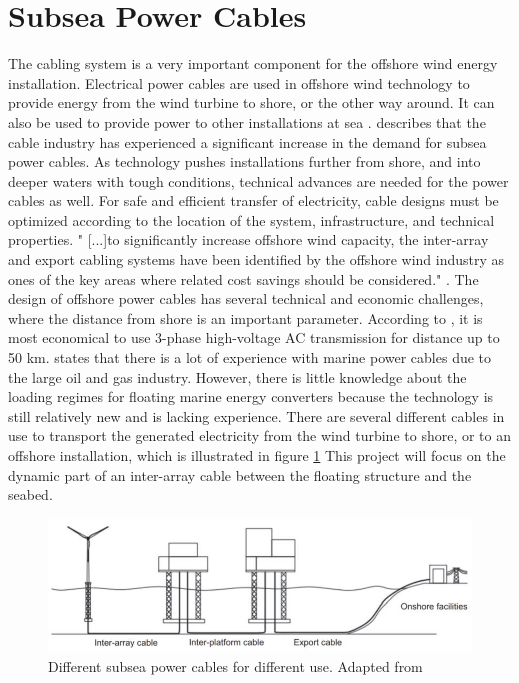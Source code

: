 \section{Subsea Power Cables}
 The cabling system is a very important component for the offshore wind energy installation. Electrical power cables are used in offshore wind technology to provide energy from the wind turbine to shore, or the other way around. It can also be used to provide power to other installations at sea \cite{Nasution2013}.  \cite{srinil2016} describes that the cable industry has experienced a significant increase in the demand for subsea power cables. As technology pushes installations further from shore, and into deeper waters with tough conditions, technical advances are needed for the power cables as well. For safe and efficient transfer of electricity, cable designs must be optimized according to the location of the system, infrastructure, and technical properties. " [...]to significantly increase offshore wind capacity, the inter-array and export cabling systems have been identified by the offshore wind industry as ones of the key areas where related cost savings should be considered."  \cite{srinil2016}. The design of offshore power cables has several technical and economic challenges, where the distance from shore is an important parameter. According to \cite{Lynn2011}, it is most economical to use 3-phase high-voltage AC transmission for distance up to 50 km.\newline
 \newline
 \cite{Thies2012} states that there is a lot of experience with marine power cables due to the large oil and gas industry. However, there is little knowledge about the loading regimes for floating marine energy converters because the technology is still relatively new and is lacking experience. 
 \newline
 \newline
 There are several different cables in use to transport the generated electricity from the wind turbine to shore, or to an offshore installation, which is illustrated in figure \ref{fig:diffcable} This project will focus on the dynamic part of an inter-array cable between the floating structure and the seabed. 
 
 \begin{figure}[H]
\centering
\includegraphics[scale=0.8]{figures/diffcable}
\caption[$\; \:$Different subsea power cable]{Different subsea power cables for different use. Adapted from   \cite{srinil2016} }
 \label{fig:diffcable}
\end{figure}

